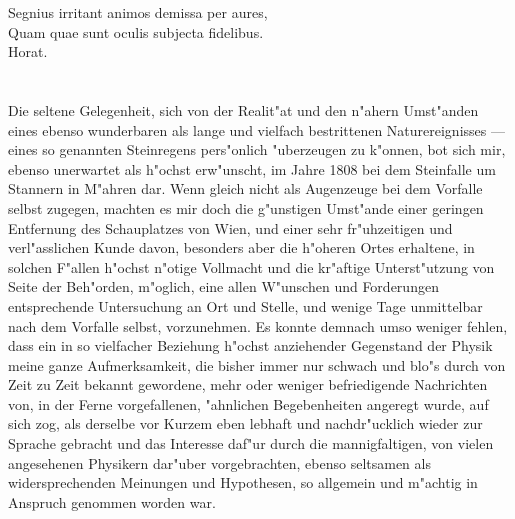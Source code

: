 \documentclass[a4paper, 11pt, oneside, german]{article}
\begin{document}
\setlength{\parskip}{1mm plus1mm minus1mm}
\clearpage
\tableofcontents
\clearpage
\vspace*{\fill}
{\begin{center}
Segnius irritant animos demissa per aures,\\
Quam quae sunt oculis subjecta fidelibus.\\
Horat.
\end{center}}
\vspace*{\fill}
\clearpage
\LARGE
\pagestyle{fancy}
\fancyhf{}
\cfoot{\swabfamily{\swabfamily{\thepage}}}
\section*{}
\paragraph{}
Die seltene Gelegenheit, sich von der Realit"at und den n"ahern Umst"anden eines ebenso wunderbaren als lange und vielfach bestrittenen Naturereignisses --- eines so genannten Steinregens pers"onlich "uberzeugen zu k"onnen, bot sich mir, ebenso unerwartet als h"ochst erw"unscht, im Jahre 1808 bei dem Steinfalle um Stannern in M"ahren dar. Wenn gleich nicht als Augenzeuge bei dem Vorfalle selbst zugegen, machten es mir doch die g"unstigen Umst"ande einer geringen Entfernung des Schauplatzes von Wien, und einer sehr fr"uhzeitigen und verl"asslichen Kunde davon, besonders aber die h"oheren Ortes erhaltene, in solchen F"allen h"ochst n"otige Vollmacht und die kr"aftige Unterst"utzung von Seite der Beh"orden, m"oglich, eine allen W"unschen und Forderungen entsprechende Untersuchung an Ort und Stelle, und wenige Tage unmittelbar nach dem Vorfalle selbst, vorzunehmen. Es konnte demnach umso weniger fehlen, dass ein in so vielfacher Beziehung h"ochst anziehender Gegenstand der Physik meine ganze Aufmerksamkeit, die bisher immer nur schwach und blo"s durch von Zeit zu Zeit bekannt gewordene, mehr oder weniger befriedigende Nachrichten von, in der Ferne vorgefallenen, "ahnlichen Begebenheiten angeregt wurde, auf sich zog, als derselbe vor Kurzem eben lebhaft und nachdr"ucklich wieder zur Sprache gebracht und das Interesse daf"ur durch die mannigfaltigen, von vielen angesehenen Physikern dar"uber vorgebrachten, ebenso seltsamen als widersprechenden Meinungen und Hypothesen, so allgemein und m"achtig in Anspruch genommen worden war.
\end{document}
